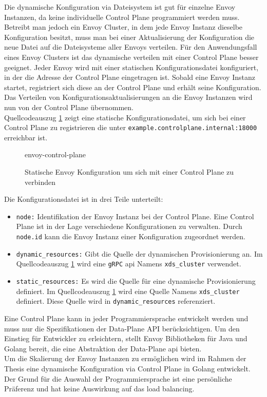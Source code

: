 Die dynamische Konfiguration via Dateisystem ist gut für einzelne Envoy Instanzen, da keine individuelle Control Plane programmiert werden muss. Betreibt man jedoch ein Envoy Cluster, in dem jede Envoy Instanz dieselbe Konfiguration besitzt, muss man bei einer Aktualisierung der Konfiguration die neue Datei auf die Dateisysteme aller Envoys verteilen.
Für den Anwendungsfall eines Envoy Clusters ist das dynamische verteilen mit einer Control Plane besser geeignet. Jeder Envoy wird mit einer statischen Konfigurationsdatei konfiguriert, in der die Adresse der Control Plane eingetragen ist. Sobald eine Envoy Instanz startet, registriert sich diese an der Control Plane und erhält seine Konfiguration. Das Verteilen von Konfigurationsaktualisierungen an die Envoy Instanzen wird nun von der Control Plane übernommen.
\\
Quellcodeauszug \ref{code:envoy-control-plane} zeigt eine statische Konfigurationsdatei, um sich bei einer Control Plane zu registrieren die unter \verb|example.controlplane.internal:18000| erreichbar ist.
\begin{figure}
    {envoy-control-plane}
    \caption{Statische Envoy Konfiguration um sich mit einer Control Plane zu verbinden}
    \label{code:envoy-control-plane}
\end{figure}
Die Konfigurationsdatei ist in drei Teile unterteilt:
\begin{itemize}
  \item \verb|node:| Identifikation der Envoy Instanz bei der Control Plane. Eine Control Plane ist in der Lage verschiedene Konfigurationen zu verwalten. Durch \verb|node.id| kann die Envoy Instanz einer Konfiguration zugeordnet werden.
  \item \verb|dynamic_resources:| Gibt die Quelle der dynamischen Provisionierung an. Im Quellcodeauszug \ref{code:envoy-control-plane} wird eine \verb|gRPC| \ac{api} Namens \verb|xds_cluster| verwendet.
  \item \verb|static_resources:| Es wird die Quelle für eine dynamische Provisionierung definiert. Im Quellcodeauszug \ref{code:envoy-control-plane} wird eine Quelle Namens \verb|xds_cluster| definiert. Diese Quelle wird in \verb|dynamic_resources| referenziert.
\end{itemize}
Eine Control Plane kann in jeder Programmiersprache entwickelt werden und muss nur die Spezifikationen der Data-Plane API \cite{EnvoyproxyDataplaneapi2021} berücksichtigen. Um den Einstieg für Entwickler zu erleichtern, stellt Envoy Bibliotheken für Java und Golang bereit, die eine Abstraktion der Data-Plane \ac{api} bieten.
\\
Um die Skalierung der Envoy Instanzen zu ermöglichen wird im Rahmen der Thesis eine dynamische Konfiguration via Control Plane in Golang entwickelt. Der Grund für die Auswahl der Programmiersprache ist eine persönliche Präferenz und hat keine Auswirkung auf das load balancing.

